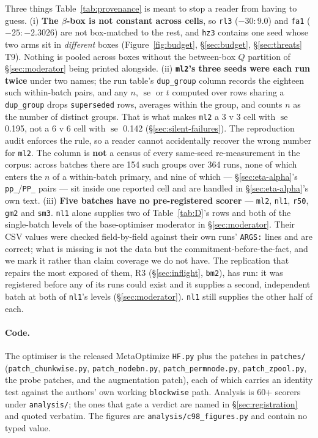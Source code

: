 \documentclass[10pt,letterpaper]{article}
\newcommand{\arm}[1]{\texttt{#1}}
\DeclareMathOperator{\se}{se}
\begin{document}
Three things Table~\ref{tab:provenance} is meant to stop a reader from having to guess.
(i) \textbf{The $\beta$-box is not constant across cells}, so \arm{rl3} ($-30{:}9.0$) and \arm{fa1}
($-25{:}{-}2.3026$) are not box-matched to the rest, and \arm{hz3} contains one seed whose two arms
sit in \emph{different} boxes (Figure~\ref{fig:budget}, \S\ref{sec:budget},
\S\ref{sec:threats} T9). Nothing is pooled across boxes without the between-box $Q$ partition of
\S\ref{sec:moderator} being printed alongside. (ii) \textbf{\arm{ml2}'s three seeds were each run
twice} under two names; the run table's \texttt{dup\_group} column records the eighteen such
within-batch pairs, and any $n$, $\se$ or $t$ computed over rows sharing a \texttt{dup\_group}
drops \texttt{superseded} rows, averages
within the group, and counts $n$ as the number of distinct groups. That is what makes
\arm{ml2} a 3 v 3 cell with $\se$ 0.195, not a 6 v 6 cell with $\se$ 0.142
(\S\ref{sec:silent-failures}). The reproduction audit enforces the rule, so a reader cannot
accidentally recover the wrong number for \arm{ml2}. The column is \textbf{not} a census of every
same-seed re-measurement in the corpus: across batches there are 154 such groups over 364 runs,
none of which enters the $n$ of a within-batch primary, and nine of which ---
\S\ref{sec:eta-alpha}'s \arm{pp\_}/\arm{PP\_} pairs --- sit inside one reported cell and are
handled in \S\ref{sec:eta-alpha}'s own text. (iii) \textbf{Five batches have no pre-registered scorer}
--- \arm{ml2}, \arm{nl1}, \arm{r50}, \arm{gm2} and \arm{sm3}. \arm{nl1} alone supplies two of
Table~\ref{tab:D}'s rows and both of the single-batch levels of the base-optimiser moderator in
\S\ref{sec:moderator}. Their CSV values were checked field-by-field against their own runs'
\texttt{ARGS:} lines and are correct; what is missing is not the data but the
commitment-before-the-fact, and we mark it rather than claim coverage we do not have. The
replication that repairs the most exposed of them, R3 (\S\ref{sec:inflight}, \arm{bm2}), has run:
it was registered before any of its runs could exist and it supplies a second, independent batch
at both of \arm{nl1}'s levels (\S\ref{sec:moderator}). \arm{nl1} still supplies the other half of
each.

\paragraph{Code.}
The optimiser is the released MetaOptimize \texttt{HF.py} plus the patches in \texttt{patches/}
(\texttt{patch\_chunkwise.py}, \texttt{patch\_nodebn.py}, \texttt{patch\_permnode.py},
\texttt{patch\_zpool.py}, the probe patches, and the augmentation patch), each of which carries an
identity test against the authors' own working \arm{blockwise} path. Analysis is 60+ scorers under
\texttt{analysis/}; the ones that gate a verdict are named in \S\ref{sec:registration} and quoted
verbatim. The figures are \texttt{analysis/c98\_figures.py} and contain no typed value.
\end{document}
